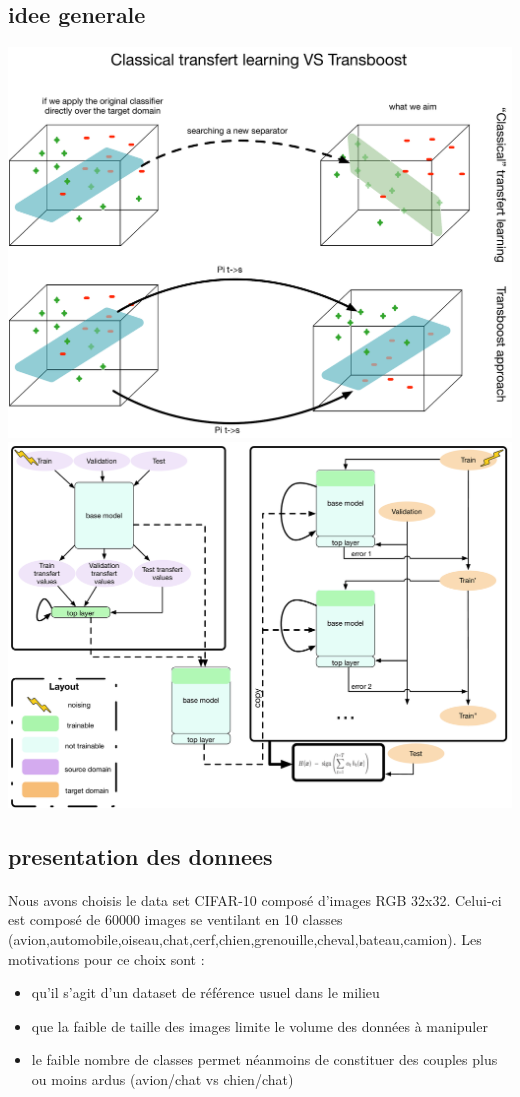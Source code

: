 \documentclass[11 pt]{article}
\begin{document}
\subsection{idee generale}
\includegraphics[width=\textwidth]{fig2.pdf}
\includegraphics[width=\textwidth]{fig1.pdf}

\subsection{presentation des donnees}
\paragraph{}Nous avons choisis le data set CIFAR-10 composé d’images RGB 32x32. Celui-ci est composé de 60000 images se ventilant en 10 classes (avion,automobile,oiseau,chat,cerf,chien,grenouille,cheval,bateau,camion). Les motivations pour ce choix sont :\\ \medskip
\begin{itemize}
  \item qu’il s’agit d’un dataset de référence usuel dans le milieu
  \item que la faible de taille des images limite le volume des données à manipuler
  \item le faible nombre de classes permet néanmoins de constituer des couples plus ou moins ardus (avion/chat vs chien/chat)
\end{itemize}
\end{document}
